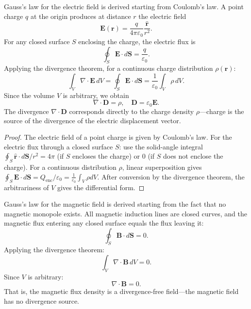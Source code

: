 \begin{theorem}\label{thm:gauss_electric_derivation}
Gauss's law for the electric field is derived starting from Coulomb's law. A point charge $q$ at the origin produces at distance $r$ the electric field
\[
\mathbf{E}(\mathbf{r}) = \frac{q}{4\pi\varepsilon_0} \frac{\hat{\mathbf{r}}}{r^2}.
\]
For any closed surface $S$ enclosing the charge, the electric flux is
\[
\oint_S \mathbf{E} \cdot d\mathbf{S} = \frac{q}{\varepsilon_0}.
\]
Applying the divergence theorem, for a continuous charge distribution $\rho(\mathbf{r})$:
\[
\int_V \nabla \cdot \mathbf{E} \, dV = \oint_S \mathbf{E} \cdot d\mathbf{S} = \frac{1}{\varepsilon_0} \int_V \rho \, dV.
\]
Since the volume $V$ is arbitrary, we obtain
\[
\boxed{\nabla \cdot \mathbf{D} = \rho}, \quad \mathbf{D} = \varepsilon_0 \mathbf{E}.
\]
The divergence $\nabla\cdot\mathbf{D}$ corresponds directly to the charge density $\rho$---charge is the source of the divergence of the electric displacement vector.
\end{theorem}

\begin{proof}
The electric field of a point charge is given by Coulomb's law. For the electric flux through a closed surface $S$: use the solid-angle integral $\oint_S \hat{\mathbf{r}}\cdot d\mathbf{S}/r^2 = 4\pi$ (if $S$ encloses the charge) or $0$ (if $S$ does not enclose the charge). For a continuous distribution $\rho$, linear superposition gives $\oint_S \mathbf{E}\cdot d\mathbf{S} = Q_{\text{enc}}/\varepsilon_0 = \frac{1}{\varepsilon_0}\int_V \rho dV$. After conversion by the divergence theorem, the arbitrariness of $V$ gives the differential form.
\end{proof}

\begin{theorem}\label{thm:gauss_magnetic_derivation}
Gauss's law for the magnetic field is derived starting from the fact that no magnetic monopole exists. All magnetic induction lines are closed curves, and the magnetic flux entering any closed surface equals the flux leaving it:
\[
\oint_S \mathbf{B} \cdot d\mathbf{S} = 0.
\]
Applying the divergence theorem:
\[
\int_V \nabla \cdot \mathbf{B} \, dV = 0.
\]
Since $V$ is arbitrary:
\[
\boxed{\nabla \cdot \mathbf{B} = 0}.
\]
That is, the magnetic flux density is a divergence-free field---the magnetic field has no divergence source.
\end{theorem}


